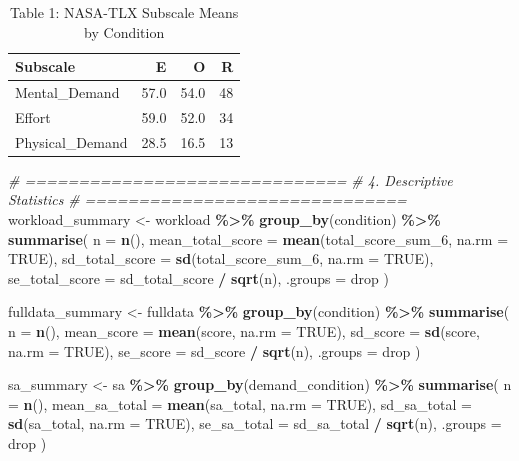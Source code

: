 \documentclass[
]{article}
\newenvironment{Shaded}{\begin{snugshade}}{\end{snugshade}}
\newcommand{\AttributeTok}[1]{\textcolor[rgb]{0.13,0.29,0.53}{#1}}
\newcommand{\CommentTok}[1]{\textcolor[rgb]{0.56,0.35,0.01}{\textit{#1}}}
\newcommand{\ConstantTok}[1]{\textcolor[rgb]{0.56,0.35,0.01}{#1}}
\newcommand{\FunctionTok}[1]{\textcolor[rgb]{0.13,0.29,0.53}{\textbf{#1}}}
\newcommand{\NormalTok}[1]{#1}
\newcommand{\OtherTok}[1]{\textcolor[rgb]{0.56,0.35,0.01}{#1}}
\newcommand{\SpecialCharTok}[1]{\textcolor[rgb]{0.81,0.36,0.00}{\textbf{#1}}}
\newcommand{\StringTok}[1]{\textcolor[rgb]{0.31,0.60,0.02}{#1}}
\begin{document}
\begin{longtable}[t]{lrrr}
\caption{\label{tab:full-analysis}Table 1: NASA-TLX Subscale Means by Condition}\\
\toprule
Subscale & E & O & R\\
\midrule
Mental\_Demand & 57.0 & 54.0 & 48\\
Effort & 59.0 & 52.0 & 34\\
Physical\_Demand & 28.5 & 16.5 & 13\\
\bottomrule
\end{longtable}

\begin{Shaded}
\begin{Highlighting}[]
\CommentTok{\# ==============================}
\CommentTok{\# 4. Descriptive Statistics}
\CommentTok{\# ==============================}
\NormalTok{workload\_summary }\OtherTok{\textless{}{-}}\NormalTok{ workload }\SpecialCharTok{\%\textgreater{}\%}
  \FunctionTok{group\_by}\NormalTok{(condition) }\SpecialCharTok{\%\textgreater{}\%}
  \FunctionTok{summarise}\NormalTok{(}
    \AttributeTok{n =} \FunctionTok{n}\NormalTok{(),}
    \AttributeTok{mean\_total\_score =} \FunctionTok{mean}\NormalTok{(total\_score\_sum\_6, }\AttributeTok{na.rm =} \ConstantTok{TRUE}\NormalTok{),}
    \AttributeTok{sd\_total\_score =} \FunctionTok{sd}\NormalTok{(total\_score\_sum\_6, }\AttributeTok{na.rm =} \ConstantTok{TRUE}\NormalTok{),}
    \AttributeTok{se\_total\_score =}\NormalTok{ sd\_total\_score }\SpecialCharTok{/} \FunctionTok{sqrt}\NormalTok{(n),}
    \AttributeTok{.groups =} \StringTok{\textquotesingle{}drop\textquotesingle{}}
\NormalTok{  )}

\NormalTok{fulldata\_summary }\OtherTok{\textless{}{-}}\NormalTok{ fulldata }\SpecialCharTok{\%\textgreater{}\%}
  \FunctionTok{group\_by}\NormalTok{(condition) }\SpecialCharTok{\%\textgreater{}\%}
  \FunctionTok{summarise}\NormalTok{(}
    \AttributeTok{n =} \FunctionTok{n}\NormalTok{(),}
    \AttributeTok{mean\_score =} \FunctionTok{mean}\NormalTok{(score, }\AttributeTok{na.rm =} \ConstantTok{TRUE}\NormalTok{),}
    \AttributeTok{sd\_score =} \FunctionTok{sd}\NormalTok{(score, }\AttributeTok{na.rm =} \ConstantTok{TRUE}\NormalTok{),}
    \AttributeTok{se\_score =}\NormalTok{ sd\_score }\SpecialCharTok{/} \FunctionTok{sqrt}\NormalTok{(n),}
    \AttributeTok{.groups =} \StringTok{\textquotesingle{}drop\textquotesingle{}}
\NormalTok{  )}

\NormalTok{sa\_summary }\OtherTok{\textless{}{-}}\NormalTok{ sa }\SpecialCharTok{\%\textgreater{}\%}
  \FunctionTok{group\_by}\NormalTok{(demand\_condition) }\SpecialCharTok{\%\textgreater{}\%}
  \FunctionTok{summarise}\NormalTok{(}
    \AttributeTok{n =} \FunctionTok{n}\NormalTok{(),}
    \AttributeTok{mean\_sa\_total =} \FunctionTok{mean}\NormalTok{(sa\_total, }\AttributeTok{na.rm =} \ConstantTok{TRUE}\NormalTok{),}
    \AttributeTok{sd\_sa\_total =} \FunctionTok{sd}\NormalTok{(sa\_total, }\AttributeTok{na.rm =} \ConstantTok{TRUE}\NormalTok{),}
    \AttributeTok{se\_sa\_total =}\NormalTok{ sd\_sa\_total }\SpecialCharTok{/} \FunctionTok{sqrt}\NormalTok{(n),}
    \AttributeTok{.groups =} \StringTok{\textquotesingle{}drop\textquotesingle{}}
\NormalTok{  )}


\end{Highlighting}
\end{Shaded}
\end{document}

